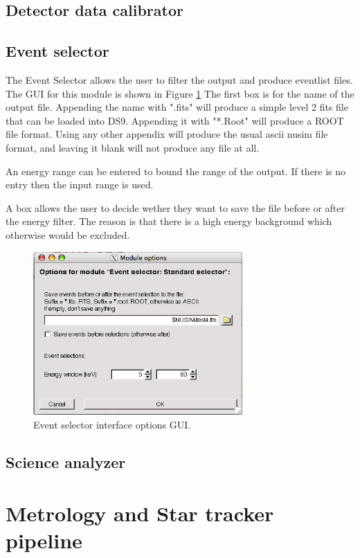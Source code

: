 \subsection{Detector data calibrator}

\subsection{Event selector}
The Event Selector allows the user to filter the output and produce eventlist files. The GUI for this module is shown in Figure \ref{eventgui} The first box is for the name of the output file. Appending the name with ".fits" will produce a simple level 2 fits file that can be loaded into DS9. Appending it with "*.Root" will produce a ROOT file format. Using any other appendix will produce the usual ascii nusim file format, and leaving it blank will not produce any file at all.

An energy range can be entered to bound the range of the output. If there is no entry then the input range is used.

A box allows the user to decide wether they want to save the file before or after the energy filter. The reason is that there is a high energy background which otherwise would be excluded.

\begin{figure}[tb]
\begin{center}
\includegraphics[width=8cm]{images/eventselectorGUI.png}  
\caption{Event selector interface options GUI.}
\label{eventgui} 
\end{center}
\end{figure}

\subsection{Science analyzer}

\section{Metrology and Star tracker pipeline}
